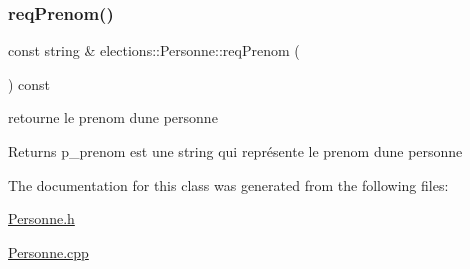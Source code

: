 \subsubsection{\texorpdfstring{req\+Prenom()}{reqPrenom()}}
{\footnotesize\ttfamily const string \& elections\+::\+Personne\+::req\+Prenom (\begin{DoxyParamCaption}{ }\end{DoxyParamCaption}) const}



retourne le prenom d\textquotesingle{}une personne 

\begin{DoxyReturn}{Returns}
p\+\_\+prenom est une string qui représente le prenom d\textquotesingle{}une personne 
\end{DoxyReturn}


The documentation for this class was generated from the following files\+:\begin{DoxyCompactItemize}
\item 
\hyperlink{Personne_8h}{Personne.\+h}\item 
\hyperlink{Personne_8cpp}{Personne.\+cpp}\end{DoxyCompactItemize}
